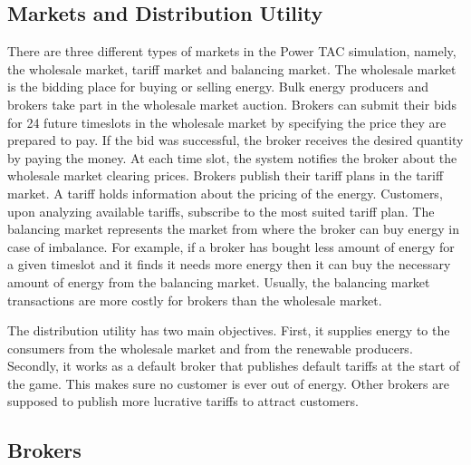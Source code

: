 \subsection{Markets and Distribution Utility}

There are three different types of markets in the Power TAC simulation, namely, the wholesale market, tariff market and balancing market. The wholesale market is the bidding place for buying or selling energy. Bulk energy producers and brokers take part in the wholesale market auction. Brokers can submit their bids for 24 future timeslots in the wholesale market by specifying the price they are prepared to pay. If the bid was successful, the broker receives the desired quantity by paying the money. At each time slot, the system notifies the broker about the wholesale market clearing prices. Brokers publish their tariff plans in the tariff market. A tariff holds information about the pricing of the energy. Customers, upon analyzing available tariffs, subscribe to the most suited tariff plan. The balancing market represents the market from where the broker can buy energy in case of imbalance. For example, if a broker has bought less amount of energy for a given timeslot and it finds it needs more energy then it can buy the necessary amount of energy from the balancing market. Usually, the balancing market transactions are more costly for brokers than the wholesale market.

The distribution utility has two main objectives. First, it supplies energy to the consumers from the wholesale market and from the renewable producers. Secondly, it works as a default broker that publishes default tariffs at the start of the game. This makes sure no customer is ever out of energy. Other brokers are supposed to publish more lucrative tariffs to attract customers.

\subsection{Brokers}

